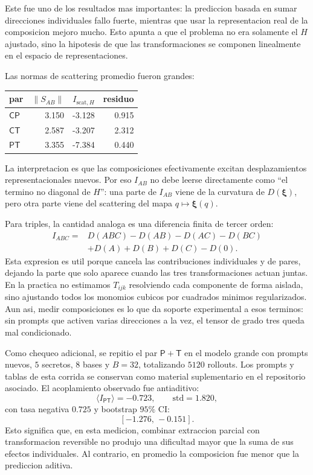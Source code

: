 \documentclass[10pt,twocolumn]{article}
\newcommand{\Ctrans}{\mathsf{C}}
\newcommand{\Ptrans}{\mathsf{P}}
\newcommand{\Ttrans}{\mathsf{T}}
\newcommand{\xrep}{\bm{\xi}}
\begin{document}
Este fue uno de los resultados mas importantes: la prediccion basada en sumar direcciones individuales fallo fuerte, mientras que usar la representacion real de la composicion mejoro mucho. Esto apunta a que el problema no era solamente el \(H\) ajustado, sino la hipotesis de que las transformaciones se componen linealmente en el espacio de representaciones.

Las normas de scattering promedio fueron grandes:

\begin{center}
\scriptsize
\begin{tabular}{@{}lrrr@{}}
\toprule
par & \(\|S_{AB}\|\) & \(I_{\mathrm{scat},H}\) & residuo \\
\midrule
\(\Ctrans\Ptrans\) & 3.150 & -3.128 & 0.915 \\
\(\Ctrans\Ttrans\) & 2.587 & -3.207 & 2.312 \\
\(\Ptrans\Ttrans\) & 3.355 & -7.384 & 0.440 \\
\bottomrule
\end{tabular}
\end{center}

La interpretacion es que las composiciones efectivamente excitan desplazamientos representacionales nuevos. Por eso \(I_{AB}\) no debe leerse directamente como ``el termino no diagonal de \(H\)'': una parte de \(I_{AB}\) viene de la curvatura de \(D(\xrep)\), pero otra parte viene del scattering del mapa \(q\mapsto\xrep(q)\).

Para triples, la cantidad analoga es una diferencia finita de tercer orden:
\[
\begin{aligned}
I_{ABC}
={}&D(ABC)-D(AB)-D(AC)-D(BC)\\
&+D(A)+D(B)+D(C)-D(0).
\end{aligned}
\]
Esta expresion es util porque cancela las contribuciones individuales y de pares, dejando la parte que solo aparece cuando las tres transformaciones actuan juntas. En la practica no estimamos \(T_{ijk}\) resolviendo cada componente de forma aislada, sino ajustando todos los monomios cubicos por cuadrados minimos regularizados. Aun asi, medir composiciones es lo que da soporte experimental a esos terminos: sin prompts que activen varias direcciones a la vez, el tensor de grado tres queda mal condicionado.

Como chequeo adicional, se repitio el par \(\Ptrans+\Ttrans\) en el modelo grande con prompts nuevos, \(5\) secretos, \(8\) bases y \(B=32\), totalizando \(5120\) rollouts. Los prompts y tablas de esta corrida se conservan como material suplementario en el repositorio asociado. El acoplamiento observado fue antiaditivo:
\[
\langle I_{\Ptrans\Ttrans}\rangle=-0.723,
\qquad
\mathrm{std}=1.820,
\]
con tasa negativa \(0.725\) y bootstrap \(95\%\) CI:
\[
[-1.276,\,-0.151].
\]
Esto significa que, en esta medicion, combinar extraccion parcial con transformacion reversible no produjo una dificultad mayor que la suma de sus efectos individuales. Al contrario, en promedio la composicion fue menor que la prediccion aditiva.
\end{document}

